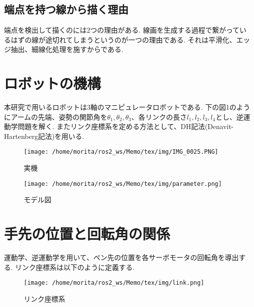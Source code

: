 \documentclass[a4j]{jarticle}			%
\begin{document}
\begin{multicols}{2}

\subsection{端点を持つ線から描く理由}
端点を検出して描くのには2つの理由がある.
線画を生成する過程で繋がっているはずの線が途切れてしまうというのが一つの理由である.
それは平滑化、エッジ抽出、細線化処理を施すからである.

\end{multicols}
\section{ロボットの機構}
本研究で用いるロボットは3軸のマニピュレータロボットである.
下の図1のようにアームの先端、姿勢の関節角を$\theta_1, \theta_2, \theta_3$、各リンクの長さ$l_1, l_2, l_3, l_4$とし、逆運動学問題を解く.
またリンク座標系を定める方法として、DH記法(Denavit-Hartenberg記法)を用いる.


\begin{figure}[htbp]
\begin{center}
\texttt{[image: /home/morita/ros2\_ws/Memo/tex/img/IMG\_0025.PNG]}
\caption{実機}
\end{center}
\end{figure}

\begin{figure}[htbp]
\begin{center}
\texttt{[image: /home/morita/ros2\_ws/Memo/tex/img/parameter.png]}
\caption{モデル図}
\end{center}
\end{figure}


\section{手先の位置と回転角の関係}

運動学、逆運動学を用いて、ペン先の位置を各サーボモータの回転角を導出する.
リンク座標系は以下のように定義する.
\begin{figure}[htbp]
\begin{center}
\texttt{[image: /home/morita/ros2\_ws/Memo/tex/img/link.png]}
\caption{リンク座標系}
\end{center}
\end{figure}
\end{document}

